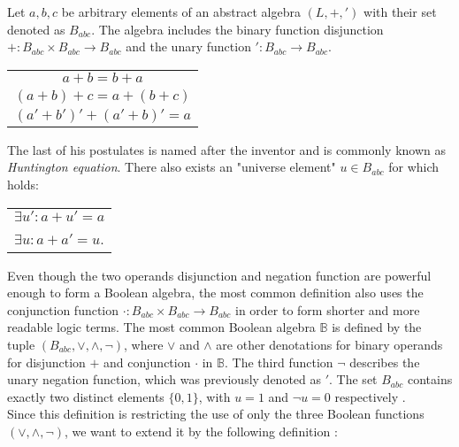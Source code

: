 \begin{definition}\label{Def:BasBool}
	Let $a, b, c$ be arbitrary elements of an abstract algebra $(L, +, ')$ with their set denoted as $B_{abc}$. The algebra includes the binary function disjunction $+ : B_{abc} \times B_{abc} \rightarrow B_{abc}$ and the unary function $' : B_{abc} \rightarrow B_{abc}$.
	\begin{table}[h]
		\centering
		\begin{tabular}{c}
			$a + b = b + a$ \\
			$(a + b) + c =  a + (b + c)$\\
			$(a' + b')' + (a' + b)' = a$\\
		\end{tabular}
	\end{table}
	
	The last of his postulates is named after the inventor and is commonly known as \textit{Huntington equation}. There also exists an "universe element" $u \in B_{abc}$ for which holds:
	
	\begin{table}[h]
		\centering
		\begin{tabular}{l}
			$\exists u' : a + u' = a$ \\
			$\exists u : a + a' = u$. \\
		\end{tabular}
	\end{table}
	
\end{definition}

Even though the two operands disjunction and negation function are powerful enough to form a Boolean algebra, the most common definition also uses the conjunction function $\cdot : B_{abc} \times B_{abc} \rightarrow B_{abc}$ in order to form shorter and more readable logic terms.
The most common Boolean algebra $\mathbb{B}$ is defined by the tuple $(B_{abc}, \vee, \wedge, \neg)$, where $\vee$ and $\wedge$ are other denotations for binary operands for disjunction $+$ and conjunction $\cdot$ in $\mathbb{B}$. The third function $\neg$ describes the unary negation function, which was previously denoted as $'$. The set $B_{abc}$ contains exactly two distinct elements $\{0, 1\}$, with $u=1$ and $\neg u = 0$ respectively \cite{Boolean_def}.\\

Since this definition is restricting the use of only the three Boolean functions $(\vee, \wedge, \neg)$, we want to extend it by the following definition \cite{muti_output_boolean_function}:

